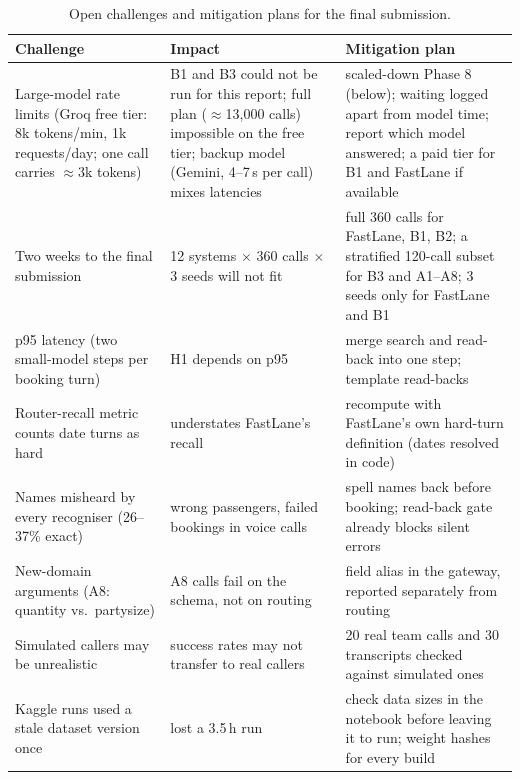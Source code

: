 \documentclass[11pt,a4paper]{article}
\newcommand{\cmd}[1]{{\small\ttfamily\def\_{\textunderscore\allowbreak}#1}}  %
\begin{document}
\begin{table}[tbp]
\centering\small
\begin{tabularx}{\linewidth}{@{}>{\raggedright\arraybackslash}p{3.9cm}LL@{}}
\toprule
Challenge & Impact & Mitigation plan \\
\midrule
Large-model rate limits (Groq free tier: 8k tokens/min, 1k requests/day; one call carries $\approx$3k tokens) & B1 and B3 could not be run for this report; full plan ($\approx$13,000 calls) impossible on the free tier; backup model (Gemini, 4--7\,s per call) mixes latencies & scaled-down Phase 8 (below); waiting logged apart from model time; report which model answered; a paid tier for B1 and FastLane if available \\
Two weeks to the final submission & 12 systems $\times$ 360 calls $\times$ 3 seeds will not fit & full 360 calls for FastLane, B1, B2; a stratified 120-call subset for B3 and A1--A8; 3 seeds only for FastLane and B1 \\
p95 latency (two small-model steps per booking turn) & H1 depends on p95 & merge search and read-back into one step; template read-backs \\
Router-recall metric counts date turns as hard & understates FastLane's recall & recompute with FastLane's own hard-turn definition (dates resolved in code) \\
Names misheard by every recogniser (26--37\% exact) & wrong passengers, failed bookings in voice calls & spell names back before booking; read-back gate already blocks silent errors \\
New-domain arguments (A8: \cmd{quantity} vs.\ \cmd{party\_size}) & A8 calls fail on the schema, not on routing & field alias in the gateway, reported separately from routing \\
Simulated callers may be unrealistic & success rates may not transfer to real callers & 20 real team calls and 30 transcripts checked against simulated ones \\
Kaggle runs used a stale dataset version once & lost a 3.5\,h run & check data sizes in the notebook before leaving it to run; weight hashes for every build \\
\bottomrule
\end{tabularx}
\caption{Open challenges and mitigation plans for the final submission.}
\label{tab:risks}
\end{table}

\end{document}
